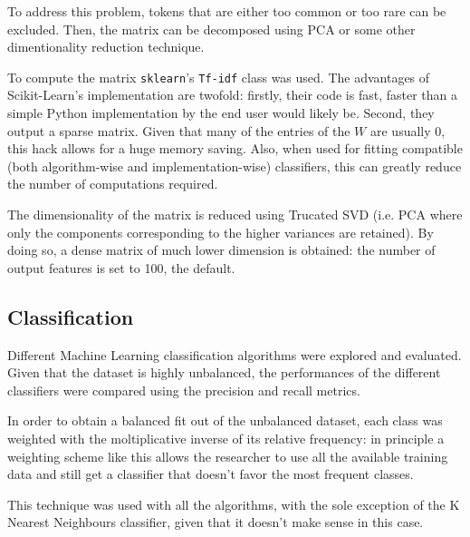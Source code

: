 To address this problem, tokens that are either too common or too rare can be excluded. Then, the matrix can be decomposed using PCA or some other dimentionality reduction technique.

To compute the matrix \texttt{sklearn}'s \texttt{Tf-idf} class was used. The advantages of Scikit-Learn's implementation are twofold: firstly, their code is fast, faster than a simple Python implementation by the end user would likely be. Second, they output a sparse matrix. Given that many of the entries of the $W$ are usually 0, this hack allows for a huge memory saving. Also, when used for fitting compatible (both algorithm-wise and implementation-wise) classifiers, this can greatly reduce the number of computations required.

The dimensionality of the matrix is reduced using Trucated SVD (i.e. PCA where only the components corresponding to the higher variances are retained). By doing so, a dense matrix of much lower dimension is obtained: the number of output features is set to 100, the default.

\subsection{Classification}
Different Machine Learning classification algorithms were explored and evaluated. Given that the dataset is highly unbalanced, the performances of the different classifiers were compared using the precision and recall metrics.

In order to obtain a balanced fit out of the unbalanced dataset, each class was weighted with the moltiplicative inverse of its relative frequency: in principle a weighting scheme like this allows the researcher to use all the available training data and still get a classifier that doesn't favor the most frequent classes.

This technique was used with all the algorithms, with the sole exception of the K Nearest Neighbours classifier, given that it doesn't make sense in this case.

